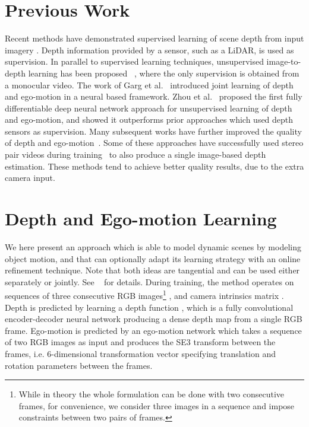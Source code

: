 \documentclass[10pt,twocolumn,letterpaper]{article}
\begin{document}
\section{Previous Work}
Recent methods have demonstrated supervised learning of scene depth from input imagery \cite{eigen2014depth,liu2015learning,laina2016deeper,mahjourian2017geometry}. Depth information provided by a sensor, such as a LiDAR, is used as supervision.
In parallel to supervised learning techniques, unsupervised image-to-depth learning has been proposed ~\cite{zhou2017unsupervised,garg2016unsupervised,godard2017monodepth,ummenhofer2017demon,mahjourian2018unsupervised}, where the only supervision is obtained from a monocular video.
The work of Garg et al.~\cite{garg2016unsupervised} introduced joint learning of depth and ego-motion in a neural based framework. Zhou et al.~\cite{zhou2017unsupervised} proposed the first fully differentiable  deep neural network approach for unsupervised learning of depth and ego-motion, and showed it outperforms prior approaches which used depth sensors as supervision.
Many subsequent works have further improved the quality of depth and ego-motion~\cite{Yang2017unsupervised,ummenhofer2017demon,mahjourian2018unsupervised,pilzer2018unsupervised,yang2018lego,yin2018geonet,wang2018learning,Kuznietsov2017semisupervised}. Some of these approaches have successfully used stereo pair videos during training~\cite{godard2017monodepth,ummenhofer2017demon,zhan2018unsupervised,yang2018every,godard2018digging} to also produce a single image-based depth estimation. These methods tend to achieve better quality results, due to the extra camera input.

\section{Depth and Ego-motion Learning}
We here present an approach which is able to model dynamic scenes by modeling object motion, and that can optionally adapt its learning strategy with an online refinement technique. Note that both ideas are tangential and can be used either separately or jointly. See ~\cite{casser2019depth} for details. During training, the method operates on sequences of three consecutive RGB images\footnote{While in theory the whole formulation can be done with two consecutive frames, for convenience, we consider three images in a sequence and impose constraints between two pairs of frames.} , and camera intrinsics matrix .
Depth is predicted by learning a depth function , which is a fully convolutional encoder-decoder neural network producing a dense depth map  from a single RGB frame. Ego-motion is predicted by an ego-motion network  which takes a sequence of two RGB images as input and produces the SE3 transform between the frames, i.e. 6-dimensional transformation vector  specifying translation and rotation parameters between the frames. 
\end{document}
